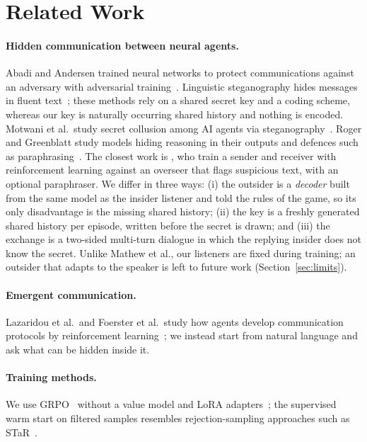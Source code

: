 \section{Related Work}
\paragraph{Hidden communication between neural agents.}
Abadi and Andersen trained neural networks to protect communications against an adversary with adversarial training~\cite{abadi2016learning}.
Linguistic steganography hides messages in fluent text~\cite{ziegler2019neural,kaptchuk2021meteor}; these methods rely on a shared secret key and a coding scheme,
whereas our key is naturally occurring shared history and nothing is encoded. Motwani et al.\ study secret collusion among AI agents via steganography~\cite{motwani2024secret}.
Roger and Greenblatt study models hiding reasoning in their outputs and defences such as paraphrasing~\cite{roger2023preventing}.
The closest work is \citet{mathew2024hidden}, who train a sender and receiver with reinforcement learning against an overseer that flags suspicious text, with an optional paraphraser.
We differ in three ways: (i) the outsider is a \emph{decoder} built from the same model as the insider listener and told the rules of the game, so its only disadvantage is the missing shared history;
(ii) the key is a freshly generated shared history per episode, written before the secret is drawn; and (iii) the exchange is a two-sided multi-turn dialogue in which the replying insider does not know the secret.
Unlike Mathew et al., our listeners are fixed during training; an outsider that adapts to the speaker is left to future work (Section~\ref{sec:limits}).
\paragraph{Emergent communication.} Lazaridou et al.\ and Foerster et al.\ study how agents develop communication protocols by reinforcement learning~\cite{lazaridou2017multi,foerster2016learning};
we instead start from natural language and ask what can be hidden inside it.
\paragraph{Training methods.} We use GRPO~\cite{shao2024deepseekmath} without a value model and LoRA adapters~\cite{hu2021lora}; the supervised warm start on filtered samples resembles rejection-sampling approaches such as STaR~\cite{zelikman2022star}.
